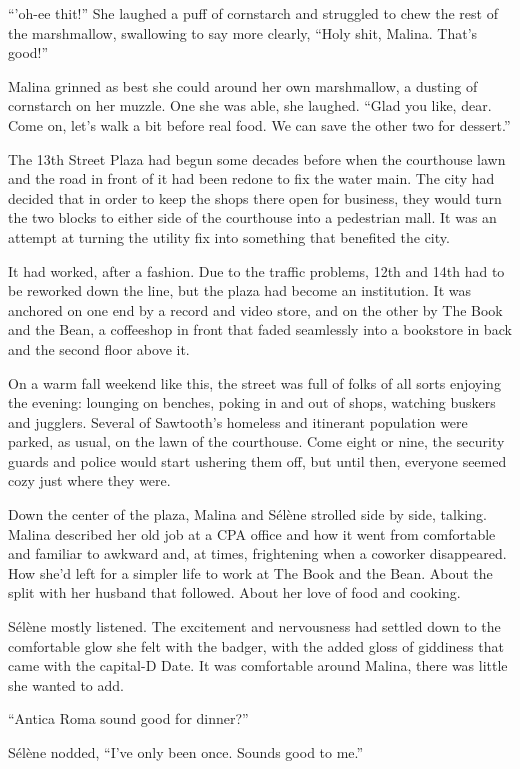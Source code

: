 ``'oh-ee thit!'' She laughed a puff of cornstarch and struggled to chew the rest of the marshmallow, swallowing to say more clearly, ``Holy shit, Malina. That's good!''

Malina grinned as best she could around her own marshmallow, a dusting of cornstarch on her muzzle. One she was able, she laughed. ``Glad you like, dear. Come on, let's walk a bit before real food. We can save the other two for dessert.''

The 13th Street Plaza had begun some decades before when the courthouse lawn and the road in front of it had been redone to fix the water main. The city had decided that in order to keep the shops there open for business, they would turn the two blocks to either side of the courthouse into a pedestrian mall. It was an attempt at turning the utility fix into something that benefited the city.

It had worked, after a fashion. Due to the traffic problems, 12th and 14th had to be reworked down the line, but the plaza had become an institution. It was anchored on one end by a record and video store, and on the other by The Book and the Bean, a coffeeshop in front that faded seamlessly into a bookstore in back and the second floor above it.

On a warm fall weekend like this, the street was full of folks of all sorts enjoying the evening: lounging on benches, poking in and out of shops, watching buskers and jugglers. Several of Sawtooth's homeless and itinerant population were parked, as usual, on the lawn of the courthouse. Come eight or nine, the security guards and police would start ushering them off, but until then, everyone seemed cozy just where they were.

Down the center of the plaza, Malina and Sélène strolled side by side, talking. Malina described her old job at a CPA office and how it went from comfortable and familiar to awkward and, at times, frightening when a coworker disappeared. How she'd left for a simpler life to work at The Book and the Bean. About the split with her husband that followed. About her love of food and cooking.

Sélène mostly listened. The excitement and nervousness had settled down to the comfortable glow she felt with the badger, with the added gloss of giddiness that came with the capital-D Date. It was comfortable around Malina, there was little she wanted to add.

``Antica Roma sound good for dinner?''

Sélène nodded, ``I've only been once. Sounds good to me.''

